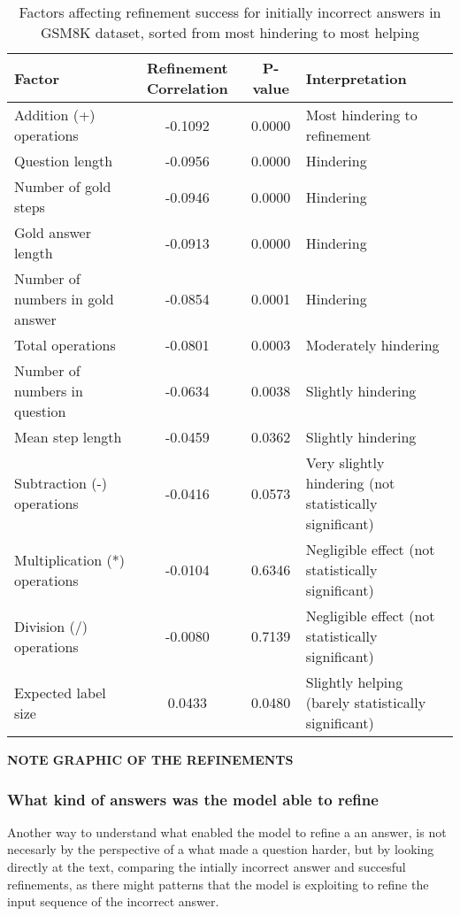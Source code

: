 \documentclass[a4paper,10pt]{article}
\begin{document}
\begin{table}[htbp]
\centering
\setlength{\tabcolsep}{4pt}  %
\begin{tabular}{|l|c|c|p{4.5cm}|}
\hline
\textbf{Factor} & \textbf{Refinement Correlation} & \textbf{P-value} & \textbf{Interpretation} \\
\hline
Addition (+) operations & -0.1092 & 0.0000 & Most hindering to refinement \\
Question length & -0.0956 & 0.0000 & Hindering \\
Number of gold steps & -0.0946 & 0.0000 & Hindering \\
Gold answer length & -0.0913 & 0.0000 & Hindering \\
Number of numbers in gold answer & -0.0854 & 0.0001 & Hindering \\
Total operations & -0.0801 & 0.0003 & Moderately hindering \\
Number of numbers in question & -0.0634 & 0.0038 & Slightly hindering \\
Mean step length & -0.0459 & 0.0362 & Slightly hindering \\
Subtraction (-) operations & -0.0416 & 0.0573 & Very slightly hindering (not statistically significant) \\
Multiplication (*) operations & -0.0104 & 0.6346 & Negligible effect (not statistically significant) \\
Division (/) operations & -0.0080 & 0.7139 & Negligible effect (not statistically significant) \\
Expected label size & 0.0433 & 0.0480 & Slightly helping (barely statistically significant) \\
\hline
\end{tabular}
\caption{Factors affecting refinement success for initially incorrect answers in GSM8K dataset, sorted from most hindering to most helping}
\label{tab:gsm8k_refinement_correlations}
\end{table}

\textbf{NOTE GRAPHIC OF THE REFINEMENTS}

\subsubsection{What kind of answers was the model able to refine}
Another way to understand what enabled the model to refine a an answer, is not necesarly by the perspective of a what made a question harder, but by looking directly at the text, comparing the intially incorrect answer and succesful refinements, as there might patterns that the model is exploiting to refine the input sequence of the incorrect answer.
\end{document}
